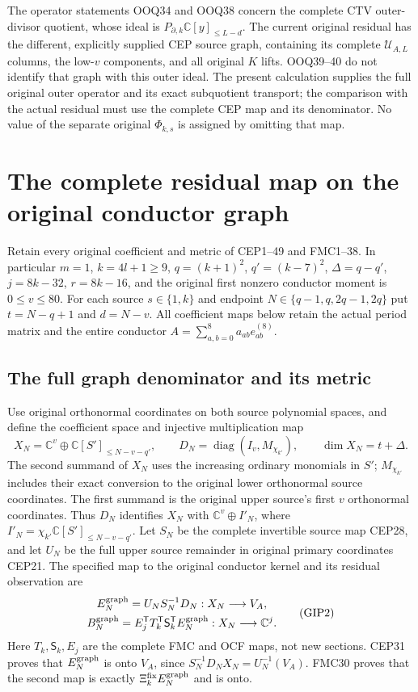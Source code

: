 \documentclass[11pt,a4paper]{article}
\begin{document}
The operator statements OOQ34 and OOQ38 concern the complete
CTV outer-divisor quotient, whose ideal is
$P_{\partial,k}\mathbb C[y]_{\le L-d}$. The current original
residual has the different, explicitly supplied CEP source
graph, containing its complete $\mathcal U_{A,L}$ columns,
the low-$v$ components, and all original $K$ lifts.
OOQ39--40 do not identify that graph with this outer ideal.
The present calculation supplies the full original outer
operator and its exact subquotient transport; the comparison
with the actual residual must use the complete CEP map and
its denominator. No value of the separate original
$\Phi_{k,s}$ is assigned by omitting that map.


\clearpage
\section{The complete residual map on the original conductor graph}
\label{sec:GIP}
Retain every original coefficient and metric of CEP1--49 and FMC1--38.
In particular $m=1$, $k=4l+1\ge9$, $q=(k+1)^2$, $q'=(k-7)^2$,
$\Delta=q-q'$, $j=8k-32$, $r=8k-16$, and the original first
nonzero conductor moment is $0\le v\le80$. For each source
$s\in\{1,k\}$ and endpoint $N\in\{q-1,q,2q-1,2q\}$ put
$t=N-q+1$ and $d=N-v$. All coefficient maps below retain the actual
period matrix and the entire conductor $A=\sum_{a,b=0}^8a_{ab}e_{ab}^{(8)}$.

\subsection{The full graph denominator and its metric}
Use original orthonormal coordinates on both source polynomial spaces,
and define the coefficient space and injective multiplication map
\[
 X_N=\mathbb C^v\oplus\mathbb C[S']_{\le N-v-q'},\qquad
 D_N=\operatorname{diag}(I_v,M_{\chi_{k'}}),\qquad
 \dim X_N=t+\Delta.
 \tag{GIP1}
\]
The second summand of $X_N$ uses the increasing ordinary monomials
in $S'$; $M_{\chi_{k'}}$ includes their exact conversion to the
original lower orthonormal source coordinates. The first summand
is the original upper source's first $v$ orthonormal coordinates.
Thus $D_N$ identifies $X_N$ with $\mathbb C^v\oplus I'_N$,
where $I'_N=\chi_{k'}\mathbb C[S']_{\le N-v-q'}$.
Let $S_N$ be the complete invertible source map CEP28, and let
$U_N$ be the full upper source remainder in original primary
coordinates CEP21. The specified map to the original conductor
kernel and its residual observation are
\[
 \begin{gathered}
 E_N^{\rm graph}=U_NS_N^{-1}D_N:X_N\longrightarrow V_A,\\
 B_N^{\rm graph}
   =E_j^{\mathsf T}T_k^{\mathsf T}\mathsf S_k^{\mathsf T}
                      E_N^{\rm graph}:X_N\longrightarrow\mathbb C^j.
 \end{gathered}\tag{GIP2}
\]
Here $T_k,\mathsf S_k,E_j$ are the complete FMC and OCF maps,
not new sections. CEP31 proves that $E_N^{\rm graph}$ is onto
$V_A$, since $S_N^{-1}D_NX_N=U_N^{-1}(V_A)$.
FMC30 proves that the second map is exactly
$\Xi_k^{\rm fix}E_N^{\rm graph}$ and is onto.
\end{document}
